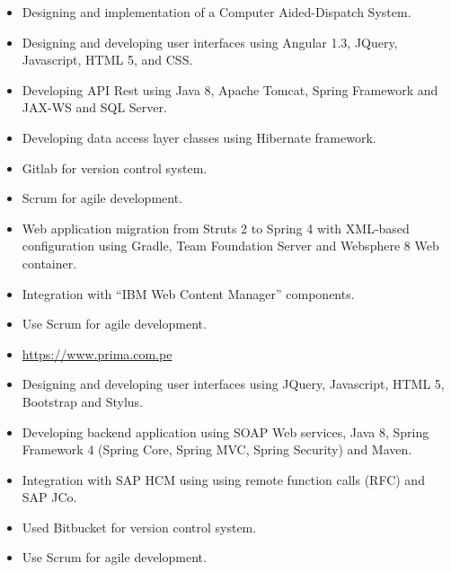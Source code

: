 \documentclass[10pt,a4paper,ragged2e]{altacv}
\begin{document}
\vspace{10px}

\begin{itemize}
   \item Designing and implementation of a Computer Aided-Dispatch System.
   \item Designing and developing user interfaces using  Angular 1.3, JQuery, Javascript, HTML 5, and CSS.
   \item Developing API Rest using Java 8, Apache Tomcat, Spring Framework and JAX-WS and SQL Server.
   \item Developing data access layer classes using Hibernate framework.
   \item Gitlab for version control system.
   \item Scrum for agile development.
\end{itemize}

\vspace{10px}

\begin{itemize}
   \item Web application migration from Struts 2 to Spring 4 with XML-based configuration using Gradle, Team Foundation Server and Websphere 8 Web container.
   \item Integration with “IBM Web Content Manager” components.
   \item Use Scrum for agile development.
   \item \url{https://www.prima.com.pe}
\end{itemize}

\vspace{10px}

\begin{itemize}
   \item Designing and developing user interfaces using JQuery, Javascript, HTML 5, Bootstrap and Stylus.
   \item Developing backend application using SOAP Web services, Java 8, Spring Framework 4 (Spring Core, Spring MVC, Spring Security) and Maven.
   \item Integration with SAP HCM using using remote function calls (RFC) and SAP JCo.
   \item Used Bitbucket for version control system.
   \item Use Scrum for agile development.
\end{itemize}
\end{document}
